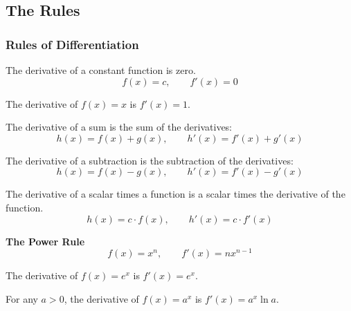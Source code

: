 \documentclass[9pt,xcolor=x11names,compress]{beamer}
\begin{document}
\subsection{The Rules}
\begin{frame}\frametitle{Rules of Differentiation}
\begin{description}[<+->]
	\item[\textbf{D1}] The derivative of a constant function is zero.
	\begin{equation*}
		f(x)=c, \qquad f'(x)=0
	\end{equation*}
	\item[\textbf{D2}] The derivative of $f(x)=x$ is $f'(x)=1$.
	\item[\textbf{D3}] The derivative of a sum is the sum of the derivatives:
	\begin{equation*}
		h(x)=f(x)+g(x),\qquad h'(x)=f'(x)+g'(x)
	\end{equation*}
	\item[\textbf{D4}] The derivative of a subtraction is the subtraction of the derivatives:
	\begin{equation*}
		h(x)=f(x)-g(x),\qquad h'(x)=f'(x)-g'(x)
	\end{equation*}
	\item[\textbf{D5}] The derivative of a scalar times a function is a scalar times the derivative of the function.
	\begin{equation*}
		h(x)=c\cdot f(x),\qquad h'(x)=c\cdot f'(x)	
	\end{equation*}
	\item[\textbf{D6}] \textbf{The Power Rule}
	\begin{equation*}
		f(x)=x^n,\qquad f'(x)=nx^{n-1}
	\end{equation*}
	\item[\textbf{D7}] The derivative of $f(x)=e^x$ is $f'(x)=e^x$.
	\item[\textbf{D8}] For any $a>0$, the derivative of $f(x)=a^x$ is $f'(x)=a^x \ln a$.
\end{description}
\end{frame}
\end{document}
